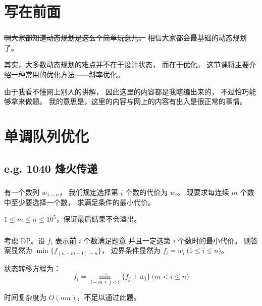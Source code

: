 \documentclass[9pt, UTF8]{beamer} %
\title{\insertsubject}
\author{Orange}
\institute{CQ No.11 High}
\date{\today}
\newcommand \ft {\frametitle{\insertsection}}
\newcommand \fts {\frametitle{\insertsubsection}}
\newcommand \bpause { \bigskip \pause }
\begin{document}
	\setlength{\parindent}{2em} %

	\begin{frame}
		\titlepage
	\end{frame}

	\section{写在前面}

	\begin{frame}
		\ft

		\sout{啊大家都知道动态规划是这么个简单玩意儿。}
		相信大家都会最基础的动态规划了。

		其实，大多数动态规划的难点并不在于设计状态，
		而在于优化。
		这节课将主要介绍一种常用的优化方法——斜率优化。

		\bpause

		由于我看不懂网上别人的讲解，
		因此这里的内容都是我瞎编出来的，
		不过恰巧能够拿来做题。
		我的意思是，这里的内容与网上的内容有出入是很正常的事情。
	\end{frame}

	\section{单调队列优化}

	\subsection{e.g. 1040 烽火传递}

	\begin{frame}
		\fts

		有一个数列 $w_{1 \sim n}$，
		我们规定选择第 $i$ 个数的代价为 $w_i$。
		现要求每连续 $m$ 个数中至少要选择一个数，
		求满足条件的最小代价。

		\bigskip

		$1 \le m \le n \le 10^5$，保证最后结果不会溢出。
	\end{frame}

	\begin{frame}
		\fts

		考虑 DP。设 $f_i$ 表示前 $i$ 个数满足题意
		并且一定选第 $i$ 个数时的最小代价。
		则答案显然为 $\min \{ f_{(n - m + 1) \sim n} \}$，
		边界条件显然为 $f_i = w_i \pod {1 \le i \le n}$。

		\bpause

		状态转移方程为：
		$$
		f_i = \min_{i - m \le j < i} \{ f_j + w_i \} \pod {m < i \le n}
		$$

		时间复杂度为 $O(nm)$，不足以通过此题。
	\end{frame}
\end{document}
